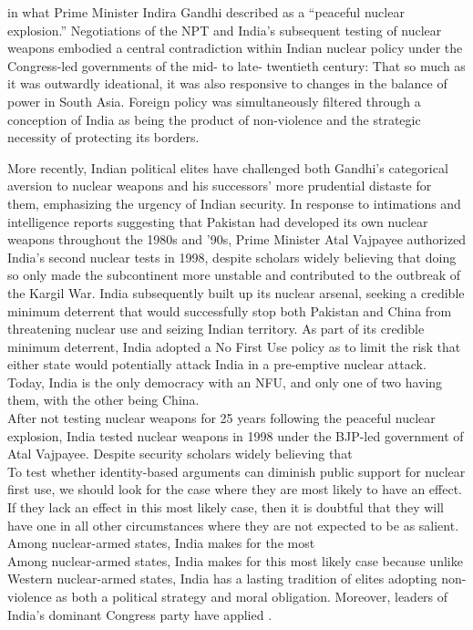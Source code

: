 \documentclass[12pt]{article}
\begin{document}
in what Prime Minister Indira Gandhi described as a “peaceful nuclear explosion.” Negotiations of the NPT and India's subsequent testing of nuclear weapons embodied a central contradiction within Indian nuclear policy under the Congress-led governments of the mid- to late- twentieth century: That so much as it was outwardly ideational, it was also responsive to changes in the balance of power in South Asia. Foreign policy was simultaneously filtered through a conception of India as being the product of non-violence and the strategic necessity of protecting its borders.

More recently, Indian political elites have challenged both Gandhi's categorical aversion to nuclear weapons and his successors' more prudential distaste for them, emphasizing the urgency of Indian security. In response to intimations and intelligence reports suggesting that Pakistan had developed its own nuclear weapons throughout the 1980s and '90s, Prime Minister Atal Vajpayee authorized India's second nuclear tests in 1998, despite scholars widely believing that doing so only made the subcontinent more unstable and contributed to the outbreak of the Kargil War. India subsequently built up its nuclear arsenal, seeking a credible minimum deterrent that would successfully stop both Pakistan and China from threatening nuclear use and seizing Indian territory. As part of its credible minimum deterrent, India adopted a No First Use policy as to limit the risk that either state would potentially attack India in a pre-emptive nuclear attack. Today, India is the only democracy with an NFU, and only one of two having them, with the other being China. \\

After not testing nuclear weapons for 25 years following the peaceful nuclear explosion, India tested nuclear weapons in 1998 under the BJP-led government of Atal Vajpayee. Despite security scholars widely believing that \\

To test whether identity-based arguments can diminish public support for nuclear first use, we should look for the case where they are most likely to have an effect. If they lack an effect in this most likely case, then it is doubtful that they will have one in all other circumstances where they are not expected to be as salient. Among nuclear-armed states, India makes for the most\\


Among nuclear-armed states, India makes for this most likely case because unlike Western nuclear-armed states, India has a lasting tradition of elites adopting non-violence as both a political strategy and moral obligation. Moreover, leaders of India's dominant Congress party have applied .\\
\end{document}
